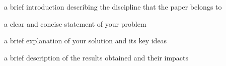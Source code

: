 a brief introduction describing the discipline that the paper belongs to

a clear and concise statement of your problem

a brief explanation of your solution and its key ideas

a brief description of the results obtained and their impacts
\TODO{}